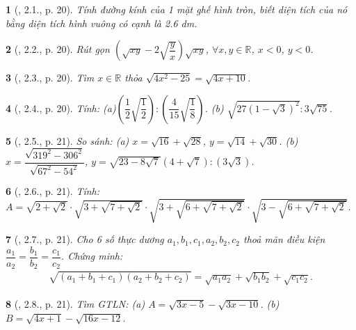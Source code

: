 \documentclass{article}
\newtheorem{baitoan}{}%
\begin{document}
\begin{baitoan}[\cite{Binh_boi_duong_Toan_9_tap_1}, 2.1., p. 20]
	Tính đường kính của 1 mặt ghế hình tròn, biết diện tích của nó bằng diện tích hình vuông có cạnh là {\rm2.6 dm}.
\end{baitoan}

\begin{baitoan}[\cite{Binh_boi_duong_Toan_9_tap_1}, 2.2., p. 20]
	Rút gọn $\left(\sqrt{xy} - 2\sqrt{\dfrac{y}{x}}\right)\sqrt{xy}$, $\forall x,y\in\mathbb{R}$, $x < 0$, $y < 0$.
\end{baitoan}

\begin{baitoan}[\cite{Binh_boi_duong_Toan_9_tap_1}, 2.3., p. 20]
	Tìm $x\in\mathbb{R}$ thỏa $\sqrt{4x^2 - 25} = \sqrt{4x + 10}$.
\end{baitoan}

\begin{baitoan}[\cite{Binh_boi_duong_Toan_9_tap_1}, 2.4., p. 20]
	Tính: (a)$\left(\dfrac{1}{2}\sqrt{\dfrac{1}{2}}\right):\left(\dfrac{4}{15}\sqrt{\dfrac{1}{8}}\right)$. (b) $\sqrt{27(1 - \sqrt{3})^2}:3\sqrt{75}$.
\end{baitoan}

\begin{baitoan}[\cite{Binh_boi_duong_Toan_9_tap_1}, 2.5., p. 21]
	So sánh: (a) $x = \sqrt{16} + \sqrt{28}$, $y = \sqrt{14} + \sqrt{30}$. (b) $x = \dfrac{\sqrt{319^2 - 306^2}}{\sqrt{67^2 - 54^2}}$, $y = \sqrt{23 - 8\sqrt{7}}(4 + \sqrt{7}):(3\sqrt{3})$.
\end{baitoan}

\begin{baitoan}[\cite{Binh_boi_duong_Toan_9_tap_1}, 2.6., p. 21]
	Tính: $A = \sqrt{2 + \sqrt{2}}\cdot\sqrt{3 + \sqrt{7 + \sqrt{2}}}\cdot\sqrt{3 + \sqrt{6 + \sqrt{7 + \sqrt{2}}}}\cdot\sqrt{3 - \sqrt{6 + \sqrt{7 + \sqrt{2}}}}$.
\end{baitoan}

\begin{baitoan}[\cite{Binh_boi_duong_Toan_9_tap_1}, 2.7., p. 21]
	Cho 6 số thực dương $a_1,b_1,c_1,a_2,b_2,c_2$ thoả mãn điều kiện $\dfrac{a_1}{a_2} = \dfrac{b_1}{b_2} = \dfrac{c_1}{c_2}$. Chứng minh:
	\begin{align*}
		\sqrt{(a_1 + b_1 + c_1)(a_2 + b_2 + c_2)} = \sqrt{a_1a_2} + \sqrt{b_1b_2} + \sqrt{c_1c_2}.
	\end{align*}
\end{baitoan}

\begin{baitoan}[\cite{Binh_boi_duong_Toan_9_tap_1}, 2.8., p. 21]
	Tìm {\rm GTLN}: (a) $A = \sqrt{3x - 5} - \sqrt{3x - 10}$. (b) $B = \sqrt{4x + 1} - \sqrt{16x - 12}$.
\end{baitoan}
\end{document}
